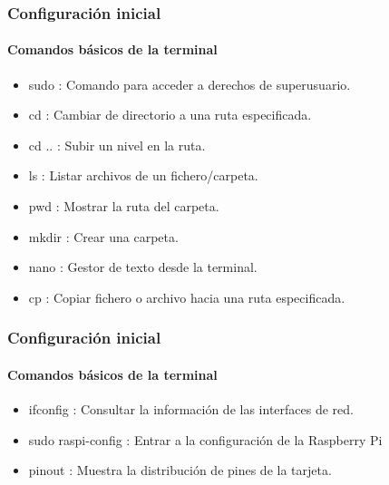 \documentclass{beamer}
\begin{document}
	\begin{frame}
		\frametitle{Configuración inicial}
		\framesubtitle{Comandos básicos de la terminal}
		\begin{tcolorbox}[enhanced, title= Instrucciones:]
			\begin{itemize}
				\item sudo :  Comando para acceder a derechos de superusuario.
				\item cd  : Cambiar de directorio a una ruta especificada.
				\item cd .. : Subir un nivel en la ruta.
				\item ls  : Listar archivos de un fichero/carpeta.
				\item pwd : Mostrar la ruta del carpeta.
				\item mkdir : Crear una carpeta.
				\item nano : Gestor de texto desde la terminal.
				\item cp   : Copiar fichero o archivo hacia una ruta especificada.
				
				
			\end{itemize}
		\end{tcolorbox}
		
	\end{frame}
	
	\begin{frame}
		\frametitle{Configuración inicial}
		\framesubtitle{Comandos básicos de la terminal}
		\begin{tcolorbox}[enhanced, title= Instrucciones:]
			\begin{itemize}
				\item ifconfig : Consultar la información de las interfaces de red.
				\item sudo raspi-config : Entrar a la configuración de la Raspberry Pi
				\item pinout : Muestra la distribución de pines de la tarjeta.
			\end{itemize}
		\end{tcolorbox}
		
		
	\end{frame}
	
\end{document}
